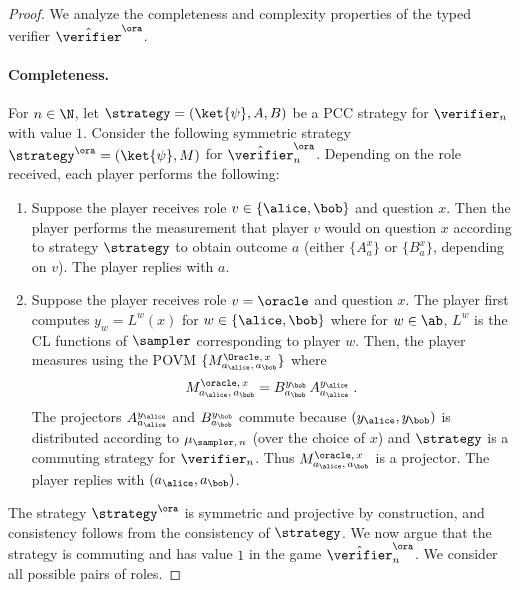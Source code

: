 \begin{proof}
  We analyze the completeness and complexity properties of the typed verifier
  $\tvora$.

  \paragraph{Completeness.}
  For $n \in \N$, let $\strategy = (\ket{\psi},A,B)$ be a PCC strategy for
  $\verifier_n$ with value $1$.
  Consider the following symmetric strategy $\strategy^\ora = (\ket{\psi}, M)$
  for $\tvora_n$.
  Depending on the role received, each player performs the following:
  \begin{enumerate}
	\item Suppose the player receives role $v \in \{\alice,\bob\}$ and question
    $x$.
    Then the player performs the measurement that player $v$ would on question
    $x$ according to strategy $\strategy$ to obtain outcome $a$ (either
    $\{A^{x}_a\}$ or $\{B^x_a\}$, depending on $v$).
    The player replies with $a$.
		\label{enu:oracle-honest-isolated}
		
	\item Suppose the player receives role $v = \oracle$ and question $x$.
    The player first computes $y_w = L^w(x)$ for $w \in \{\alice,\bob\}$ where
    for $w\in \ab$, $L^w$ is the CL functions of $\sampler$ corresponding to
    player $w$.
    Then, the player measures using the POVM $\{ M^{\Oracle,\, x}_{a_\alice,\,
      a_\bob}\}$ where
    \begin{equation}
      \label{eq:oracle-honest}
      M^{\oracle,\, x}_{a_\alice,\, a_\bob} = B^{y_\bob}_{a_\bob}\,
      A^{y_\alice}_{a_\alice}\;.
    \end{equation}
    The projectors $A^{y_\alice}_{a_\alice}$ and $B^{y_\bob}_{a_\bob}$
    commute because $(y_\alice, y_\bob)$ is distributed according to
    $\mu_{\sampler,\, n}$ (over the choice of $x$) and $\strategy$ is a
    commuting strategy for $\verifier_n$.
    Thus $M^{\oracle,\, x}_{a_\alice,\, a_\bob}$ is a projector.
    The player replies with $(a_\alice, a_\bob)$.
		\label{enu:oracle-honest-oracle}
  \end{enumerate}

  The strategy $\strategy^\ora$ is symmetric and projective by construction, and
  consistency follows from the consistency of $\strategy$.
  We now argue that the strategy is commuting and has value $1$ in the game
  $\tvora_n$.
  We consider all possible pairs of roles.


\end{proof}
